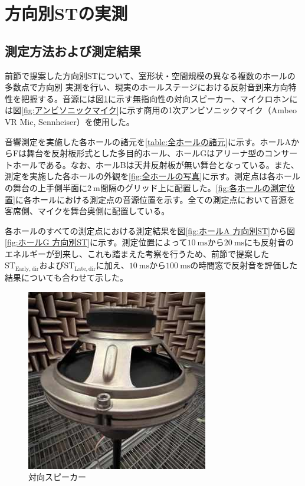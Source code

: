 \documentclass[11pt,a4j]{jreport}
\begin{document}
\section{方向別STの実測}

\subsection*{測定方法および測定結果}
前節で提案した方向別STについて、室形状・空間規模の異なる複数のホールの多数点で方向別
実測を行い、現実のホールステージにおける反射音到来方向特性を把握する。音源には図\ref{fig:対向スピーカー}に示す無指向性の対向スピーカー、マイクロホンには図\ref{fig:アンビソニックマイク}に示す商用の1次アンビソニックマイク（Ambeo VR Mic, Sennheiser）を使用した。

音響測定を実施した各ホールの諸元を\ref{table:全ホールの諸元}に示す。ホールAからFは舞台を反射板形式とした多目的ホール、ホールGはアリーナ型のコンサートホールである。なお、ホールBは天井反射板が無い舞台となっている。また、測定を実施した各ホールの外観を\ref{fig:全ホールの写真}に示す。測定点は各ホールの舞台の上手側半面に$\SI{2}{\m}$間隔のグリッド上に配置した。\ref{fig:各ホールの測定位置}に各ホールにおける測定点の音源位置を示す。全ての測定点において音源を客席側、マイクを舞台奥側に配置している。

各ホールのすべての測定点における測定結果を図\ref{fig:ホールA 方向別ST}から図\ref{fig:ホールG 方向別ST}に示す。測定位置によって$\SI{10}{\ms}$から$\SI{20}{\ms}$にも反射音のエネルギーが到来し、これも踏まえた考察を行うため、前節で提案した$\mathrm{ST_{Early,dir}}$および$\mathrm{ST_{Late,dir}}$に加え、$\SI{10}{\ms}$から$\SI{100}{\ms}$の時間窓で反射音を評価した結果についても合わせて示した。
\\

\begin{figure}[H]
  \centering
  \includegraphics[width=.3\linewidth]{images/measuredHalls/opposedSpeaker.jpg}
  \caption{対向スピーカー}
  \label{fig:対向スピーカー}
\end{figure}
\end{document}
